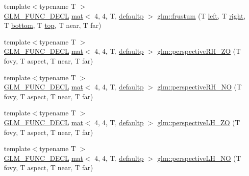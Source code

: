 \begin{DoxyCompactItemize}
\item 
{\footnotesize template$<$typename T $>$ }\\\mbox{\hyperlink{setup_8hpp_ab2d052de21a70539923e9bcbf6e83a51}{G\+L\+M\+\_\+\+F\+U\+N\+C\+\_\+\+D\+E\+CL}} \mbox{\hyperlink{structglm_1_1mat}{mat}}$<$ 4, 4, T, \mbox{\hyperlink{namespaceglm_a36ed105b07c7746804d7fdc7cc90ff25a9d21ccd8b5a009ec7eb7677befc3bf51}{defaultp}} $>$ \mbox{\hyperlink{group__gtc__matrix__transform_ga0bcd4542e0affc63a0b8c08fcb839ea9}{glm\+::frustum}} (T \mbox{\hyperlink{_s_d_l__opengl__glext_8h_a85b8f6c07fbc1fb5d77c2ae090f21995}{left}}, T \mbox{\hyperlink{_s_d_l__opengl__glext_8h_a5ffadbbacc6b89cf6218bc43b384d3fe}{right}}, T \mbox{\hyperlink{_s_d_l__opengl__glext_8h_a95fc257e5ddf46f7db9d5e898cdf1991}{bottom}}, T \mbox{\hyperlink{_s_d_l__opengl__glext_8h_a5ab323daeacf8dfdb8f91132fecdca23}{top}}, T near, T far)
\item 
{\footnotesize template$<$typename T $>$ }\\\mbox{\hyperlink{setup_8hpp_ab2d052de21a70539923e9bcbf6e83a51}{G\+L\+M\+\_\+\+F\+U\+N\+C\+\_\+\+D\+E\+CL}} \mbox{\hyperlink{structglm_1_1mat}{mat}}$<$ 4, 4, T, \mbox{\hyperlink{namespaceglm_a36ed105b07c7746804d7fdc7cc90ff25a9d21ccd8b5a009ec7eb7677befc3bf51}{defaultp}} $>$ \mbox{\hyperlink{group__gtc__matrix__transform_ga4da358d6e1b8e5b9ae35d1f3f2dc3b9a}{glm\+::perspective\+R\+H\+\_\+\+ZO}} (T fovy, T aspect, T near, T far)
\item 
{\footnotesize template$<$typename T $>$ }\\\mbox{\hyperlink{setup_8hpp_ab2d052de21a70539923e9bcbf6e83a51}{G\+L\+M\+\_\+\+F\+U\+N\+C\+\_\+\+D\+E\+CL}} \mbox{\hyperlink{structglm_1_1mat}{mat}}$<$ 4, 4, T, \mbox{\hyperlink{namespaceglm_a36ed105b07c7746804d7fdc7cc90ff25a9d21ccd8b5a009ec7eb7677befc3bf51}{defaultp}} $>$ \mbox{\hyperlink{group__gtc__matrix__transform_gad1526cb2cbe796095284e8f34b01c582}{glm\+::perspective\+R\+H\+\_\+\+NO}} (T fovy, T aspect, T near, T far)
\item 
{\footnotesize template$<$typename T $>$ }\\\mbox{\hyperlink{setup_8hpp_ab2d052de21a70539923e9bcbf6e83a51}{G\+L\+M\+\_\+\+F\+U\+N\+C\+\_\+\+D\+E\+CL}} \mbox{\hyperlink{structglm_1_1mat}{mat}}$<$ 4, 4, T, \mbox{\hyperlink{namespaceglm_a36ed105b07c7746804d7fdc7cc90ff25a9d21ccd8b5a009ec7eb7677befc3bf51}{defaultp}} $>$ \mbox{\hyperlink{group__gtc__matrix__transform_gaca32af88c2719005c02817ad1142986c}{glm\+::perspective\+L\+H\+\_\+\+ZO}} (T fovy, T aspect, T near, T far)
\item 
{\footnotesize template$<$typename T $>$ }\\\mbox{\hyperlink{setup_8hpp_ab2d052de21a70539923e9bcbf6e83a51}{G\+L\+M\+\_\+\+F\+U\+N\+C\+\_\+\+D\+E\+CL}} \mbox{\hyperlink{structglm_1_1mat}{mat}}$<$ 4, 4, T, \mbox{\hyperlink{namespaceglm_a36ed105b07c7746804d7fdc7cc90ff25a9d21ccd8b5a009ec7eb7677befc3bf51}{defaultp}} $>$ \mbox{\hyperlink{group__gtc__matrix__transform_gaead4d049d1feab463b700b5641aa590e}{glm\+::perspective\+L\+H\+\_\+\+NO}} (T fovy, T aspect, T near, T far)

\end{DoxyCompactItemize}
